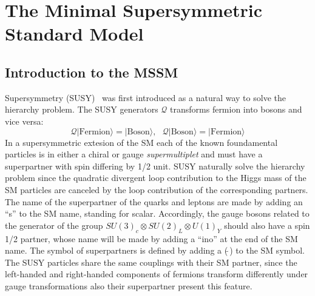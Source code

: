  
\section{The Minimal Supersymmetric Standard Model}\label{sec:MSSM}
\subsection{Introduction to the MSSM}
Supersymmetry (SUSY)~\cite{Susy1,Susy2,Susy3} was first introduced as a natural way to solve the hierarchy problem.
The SUSY generators $\mathcal{Q}$ transforms fermion into bosons and vice versa:
\begin{equation}
\mathcal{Q}|\text{Fermion}\rangle = |\text{Boson}\rangle, ~ ~ ~ \mathcal{Q}|\text{Boson}\rangle = |\text{Fermion}\rangle
\end{equation}
In a supersymmetric extesion of the SM  each of the known foundamental particles 
is in either a chiral or gauge \emph{supermultiplet} and must have a superpartner with spin differing by 1/2 unit.
SUSY naturally solve the hierarchy problem since the quadratic divergent loop contribution to the Higgs mass of the SM 
particles are canceled by the loop contribution of the corresponding partners. 
The name of the superpartner of the quarks and leptons are made by adding an ``s'' to the SM name, standing for scalar.
Accordingly, the gauge bosons related to the generator of the group $SU(3)_c \otimes SU(2)_L \otimes U(1)_Y$ should also have a spin 1/2 partner,
whose name will be made by adding a ``ino'' at the end of the SM name. The symbol of superpartners is defined by adding a ($\tilde{ ~ }$) to the SM symbol.
The SUSY particles share the same couplings with their SM partner, since the left-handed and right-handed components of fermions 
transform differently under gauge transformations also their superpartner present this feature.

